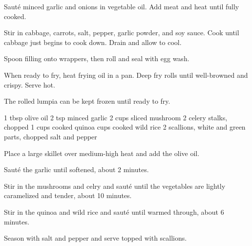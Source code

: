\begin{method}
  Saut\'e minced garlic and onions in vegetable oil.
  Add meat and heat until fully cooked.

  Stir in cabbage, carrots, salt, pepper, garlic powder,
  and soy sauce.
  Cook until cabbage just begins to cook down.
  Drain and allow to cool.

  Spoon filling onto wrappers,
  then roll and seal with egg wash.

  When ready to fry, heat frying oil in a pan.
  Deep fry rolls until well-browned and crispy.
  Serve hot.
\end{method}
\begin{tips}
  The rolled lumpia can be kept frozen
  until ready to fry.
\end{tips}

\vegan
\begin{ingreds}
  1 tbsp olive oil
  2 tsp minced garlic
  2 cups sliced mushroom
  2 celery stalks, chopped
  1  cups cooked quinoa
   cups cooked wild rice
  2 scallions, white and green parts, chopped
  salt and pepper
\end{ingreds}

\begin{method}
  Place a large skillet over medium-high heat
  and add the olive oil.

  Saut\'e the garlic until softened,
  about 2 minutes.

  Stir in the mushrooms and celry and saut\'e
  until the vegetables are lightly caramelized and tender,
  about 10 minutes.

  Stir in the quinoa and wild rice and saut\'e
  until warmed through, about 6 minutes.

  Season with salt and pepper and serve
  topped with scallions.
\end{method}
